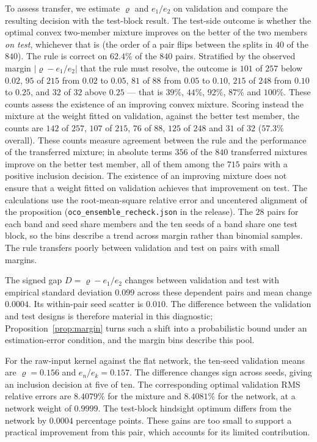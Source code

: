 \documentclass[twoside,11pt]{article}
\begin{document}
To assess transfer, we estimate $\varrho$ and $e_1/e_2$ on validation
and compare the resulting decision with the test-block result.
The test-side outcome is
whether the optimal convex two-member mixture improves on the better of the two members
\emph{on test}, whichever that is (the order of a pair flips between the
splits in $40$ of the $840$). The rule is correct on $62.4\%$ of the $840$
pairs. Stratified by the observed margin
$|\varrho-e_1/e_2|$ that the rule must resolve, the outcome is
$101$ of $257$ below $0.02$, $95$ of $215$ from $0.02$ to $0.05$, $81$ of
$88$ from $0.05$ to $0.10$, $215$ of $248$ from $0.10$ to $0.25$, and $32$
of $32$ above $0.25$ --- that is $39\%$, $44\%$, $92\%$, $87\%$ and
$100\%$. These counts assess the existence of an improving convex mixture. Scoring instead the
mixture at the weight fitted on validation, against the better test member,
the counts are $142$ of $257$, $107$ of $215$, $76$ of $88$,
$125$ of $248$ and $31$ of $32$ ($57.3\%$ overall). These counts measure agreement between
the rule and the performance of the transferred mixture; in
absolute terms $356$ of the $840$ transferred mixtures improve on the better test
member, all of them among the $715$ pairs with a positive inclusion decision.
The existence of an improving mixture does not ensure that a weight
fitted on validation achieves that improvement on test. The
calculations use the root-mean-square relative error and
uncentered alignment of the proposition
(\texttt{oco\_ensemble\_recheck.json} in the release). The $28$ pairs for each band and seed share members and the ten seeds of a band
share one test block, so the bins describe a trend across margin rather
than binomial samples. The rule transfers poorly between validation and test on pairs with small margins.

The signed gap $D=\varrho-e_1/e_2$ changes between validation and test
with empirical standard deviation $0.099$ across these dependent pairs and
mean change $0.0004$. Its within-pair seed scatter is $0.010$. The
difference between the validation and test designs is therefore material in this diagnostic;
Proposition~\ref{prop:margin} turns such a shift into a probabilistic bound
under an estimation-error condition, and the margin bins describe this pool.

For the raw-input kernel against the flat network, the ten-seed validation
means are $\varrho=0.156$ and $e_n/e_k=0.157$. The difference changes sign
across seeds, giving an inclusion decision at five of ten. The corresponding
optimal validation RMS relative errors are $8.4079\%$ for the mixture and
$8.4081\%$ for the network, at a network weight of $0.9999$. The test-block
hindsight optimum differs from the network by $0.0004$ percentage points.
These gains are too small to support a practical improvement from this
pair, which accounts for its limited contribution.
\end{document}
